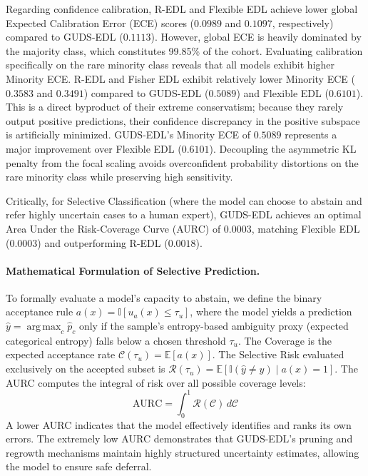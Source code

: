 \documentclass[letterpaper]{article} %
\newcommand{\E}{\mathbb{E}}
\DeclareMathOperator*{\argmax}{arg\,max}
\begin{document}
Regarding confidence calibration, R-EDL and Flexible EDL achieve lower global Expected Calibration Error (ECE) scores ($0.0989$ and $0.1097$, respectively) compared to GUDS-EDL ($0.1113$). However, global ECE is heavily dominated by the majority class, which constitutes 99.85\% of the cohort. Evaluating calibration specifically on the rare minority class reveals that all models exhibit higher Minority ECE. R-EDL and Fisher EDL exhibit relatively lower Minority ECE ($0.3583$ and $0.3491$) compared to GUDS-EDL ($0.5089$) and Flexible EDL ($0.6101$). This is a direct byproduct of their extreme conservatism; because they rarely output positive predictions, their confidence discrepancy in the positive subspace is artificially minimized. GUDS-EDL's Minority ECE of $0.5089$ represents a major improvement over Flexible EDL ($0.6101$). Decoupling the asymmetric KL penalty from the focal scaling avoids overconfident probability distortions on the rare minority class while preserving high sensitivity.

Critically, for Selective Classification (where the model can choose to abstain and refer highly uncertain cases to a human expert), GUDS-EDL achieves an optimal Area Under the Risk-Coverage Curve (AURC) of $\mathbf{0.0003}$, matching Flexible EDL ($0.0003$) and outperforming R-EDL ($0.0018$).

\paragraph{Mathematical Formulation of Selective Prediction.} To formally evaluate a model's capacity to abstain, we define the binary acceptance rule $a(x) = \mathbb{I}[u_a(x) \le \tau_u]$, where the model yields a prediction $\hat{y} = \argmax_c \hat{p}_c$ only if the sample's entropy-based ambiguity proxy (expected categorical entropy) falls below a chosen threshold $\tau_u$. The Coverage is the expected acceptance rate $\mathcal{C}(\tau_u) = \E[a(x)]$. The Selective Risk evaluated exclusively on the accepted subset is $\mathcal{R}(\tau_u) = \E[\mathbb{I}(\hat{y} \ne y) \mid a(x) = 1]$. The AURC computes the integral of risk over all possible coverage levels:
\begin{equation}
    \text{AURC} = \int_0^1 \mathcal{R}(\mathcal{C}) \, d\mathcal{C}
\end{equation}
A lower AURC indicates that the model effectively identifies and ranks its own errors. The extremely low AURC demonstrates that GUDS-EDL's pruning and regrowth mechanisms maintain highly structured uncertainty estimates, allowing the model to ensure safe deferral.
\end{document}
